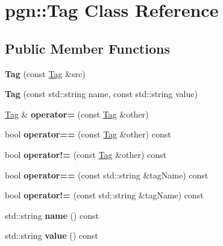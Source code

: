 \hypertarget{classpgn_1_1Tag}{
\section{pgn::Tag Class Reference}
\label{classpgn_1_1Tag}
}
\subsection*{Public Member Functions}
\begin{DoxyCompactItemize}
\item 
\hypertarget{classpgn_1_1Tag_a3f475e17a7c271c6e27b6316d42984b5}{
{\bfseries Tag} (const \hyperlink{classpgn_1_1Tag}{Tag} \&src)}
\label{classpgn_1_1Tag_a3f475e17a7c271c6e27b6316d42984b5}

\item 
\hypertarget{classpgn_1_1Tag_a0105631eb06c2c09bfb45c8475176b4a}{
{\bfseries Tag} (const std::string name, const std::string value)}
\label{classpgn_1_1Tag_a0105631eb06c2c09bfb45c8475176b4a}

\item 
\hypertarget{classpgn_1_1Tag_a7603ee8ca6ae3faf725322963f83ec94}{
\hyperlink{classpgn_1_1Tag}{Tag} \& {\bfseries operator=} (const \hyperlink{classpgn_1_1Tag}{Tag} \&other)}
\label{classpgn_1_1Tag_a7603ee8ca6ae3faf725322963f83ec94}

\item 
\hypertarget{classpgn_1_1Tag_a04560c5cdcf32ae06ff1622a278e4d50}{
bool {\bfseries operator==} (const \hyperlink{classpgn_1_1Tag}{Tag} \&other) const }
\label{classpgn_1_1Tag_a04560c5cdcf32ae06ff1622a278e4d50}

\item 
\hypertarget{classpgn_1_1Tag_ad312e4226c6370b518a5e4a1b65f25db}{
bool {\bfseries operator!=} (const \hyperlink{classpgn_1_1Tag}{Tag} \&other) const }
\label{classpgn_1_1Tag_ad312e4226c6370b518a5e4a1b65f25db}

\item 
\hypertarget{classpgn_1_1Tag_a1c6a5fa1461de15c3727aad2327a26e7}{
bool {\bfseries operator==} (const std::string \&tagName) const }
\label{classpgn_1_1Tag_a1c6a5fa1461de15c3727aad2327a26e7}

\item 
\hypertarget{classpgn_1_1Tag_ad4e64a636d5c144f6565228ea3a8bb82}{
bool {\bfseries operator!=} (const std::string \&tagName) const }
\label{classpgn_1_1Tag_ad4e64a636d5c144f6565228ea3a8bb82}

\item 
\hypertarget{classpgn_1_1Tag_adf7cbbee420589e4381167a69688aba5}{
std::string {\bfseries name} () const }
\label{classpgn_1_1Tag_adf7cbbee420589e4381167a69688aba5}

\item 
\hypertarget{classpgn_1_1Tag_aa67b2c03bed583ad96ca3ed67adbc325}{
std::string {\bfseries value} () const }
\label{classpgn_1_1Tag_aa67b2c03bed583ad96ca3ed67adbc325}

\end{DoxyCompactItemize}
